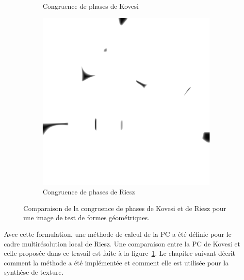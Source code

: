 \begin{figure}
\begin{subfigure}{.3\textwidth}
        \caption{Congruence de phases de Kovesi}
    \end{subfigure}
    \hfill
    \begin{subfigure}{.3\textwidth}
        \centering
        \includegraphics[width=\textwidth]{contenu/resources/images/geometric_shapes_pc_riesz}
        \caption{Congruence de phases de Riesz}
    \end{subfigure}

    \caption[Comparaison de la congruence de phases de Kovesi et de Riesz pour une image de test de formes géométriques]{Comparaison de la congruence de phases de Kovesi et de Riesz pour une image de test de formes géométriques.}
    \label{fig:phase-congruency-riesz}
\end{figure}

\bigskip

Avec cette formulation, une méthode de calcul de la PC a été définie pour le cadre multirésolution local de Riesz. Une comparaison entre la PC de Kovesi et celle proposée dans ce travail est faite à la figure~\ref{fig:phase-congruency-riesz}. Le chapitre suivant décrit comment la méthode a été implémentée et comment elle est utilisée pour la synthèse de texture.
